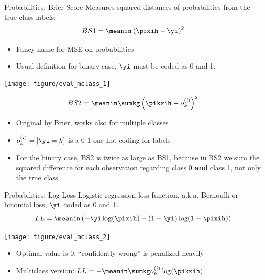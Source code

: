 \documentclass[11pt,compress,t,notes=noshow, xcolor=table]{beamer}
\newenvironment{knitrout}{}{} %
\begin{document}
\begin{vbframe}{Probabilities: Brier Score}
Measures squared distances of probabilities from the true class labels:
\[
BS1 = \meanin \left( \pixih - \yi \right)^2
\]


\begin{itemize}
  \item Fancy name for MSE on probabilities
  \item Usual definition for binary case, $\yi$ must be coded as 0 and 1.
\end{itemize}

\begin{knitrout}\scriptsize
{}\color{fgcolor}

{\centering \texttt{[image: figure/eval\_mclass\_1]} 

}



\end{knitrout}


\framebreak

\[
BS2 = \meanin \sumkg \left( \pikxih - o_k^{(i)} \right)^2
\]
\begin{itemize}
  \item Original by Brier, works also for multiple classes
  \item $ o_k^{(i)} = [ \yi = k ] $ is a 0-1-one-hot coding for labels
  \item For the binary case, BS2 is twice as large as BS1, because in BS2 we sum the squared
    difference for each observation regarding class 0 \textbf{and} class 1, not only the true class.
\end{itemize}


\end{vbframe}

\begin{vbframe}{Probabilities: Log-Loss}
Logistic regression loss function, a.k.a. Bernoulli or binomial loss, $\yi$ coded as 0 and 1.
\[
LL = \meanin \left( - \yi \log(\pixih) - (1-\yi) \log(1-\pixih) \right)
\]
\begin{knitrout}\scriptsize
{}\color{fgcolor}

{\centering \texttt{[image: figure/eval\_mclass\_2]}  

}



\end{knitrout}
\begin{itemize}
  \item Optimal value is 0, \enquote{confidently wrong} is penalized heavily
  \item Multiclass version: $ LL = - \meanin \sumkg o_k^{(i)} \log(\pikxih) $
\end{itemize}
\end{vbframe}


\endlecture
\end{document}
